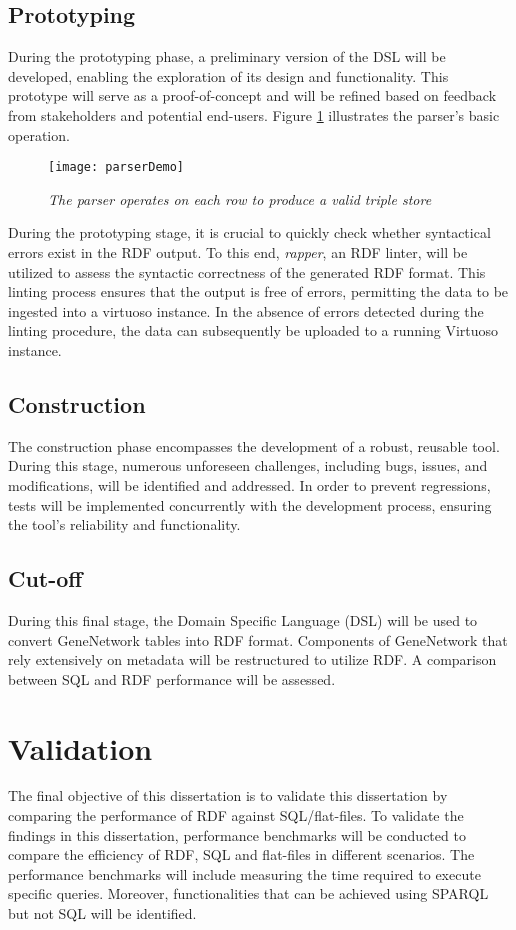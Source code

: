 \subsection{Prototyping}

During the prototyping phase, a preliminary version of the DSL will be developed, enabling the exploration of its design and functionality.  This prototype will serve as a proof-of-concept and will be refined based on feedback from stakeholders and potential end-users.  Figure \ref{fig:parser-demo} illustrates the parser's basic operation.

\begin{figure}[H]
\centering
\texttt{[image: parserDemo]}
\caption{\textit{The parser operates on each row to produce a valid triple store}}
\label{fig:parser-demo}
\centering
\end{figure}

During the prototyping stage, it is crucial to quickly check whether syntactical errors exist in the RDF output.  To this end, \textit{rapper}, an RDF linter, will be utilized to assess the syntactic correctness of the generated RDF format.  This linting process ensures that the output is free of errors, permitting the data to be ingested into a virtuoso instance.  In the absence of errors detected during the linting procedure, the data can subsequently be uploaded to a running Virtuoso instance.

\subsection{Construction}

The construction phase encompasses the development of a robust, reusable tool.  During this stage, numerous unforeseen challenges, including bugs, issues, and modifications, will be identified and addressed.  In order to prevent regressions, tests will be implemented concurrently with the development process, ensuring the tool's reliability and functionality.

\subsection{Cut-off}

During this final stage, the Domain Specific Language (DSL) will be used to convert GeneNetwork tables into RDF format.  Components of GeneNetwork that rely extensively on metadata will be restructured to utilize RDF.  A comparison between SQL and RDF performance will be assessed.

\section{Validation}

The final objective of this dissertation is to validate this dissertation by comparing the performance of RDF against SQL/flat-files.  To validate the findings in this dissertation, performance benchmarks will be conducted to compare the efficiency of RDF, SQL and flat-files in different scenarios.  The performance benchmarks will include measuring the time required to execute specific queries.  Moreover, functionalities that can be achieved using SPARQL but not SQL will be identified.
